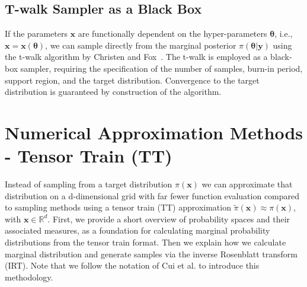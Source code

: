 \subsection{T-walk Sampler as a Black Box}
If the parameters $\bm{x}$ are functionally dependent on the hyper-parameters $\bm{\theta}$, i.e., $\bm{x} = \bm{x}(\bm{\theta})$, we can sample directly from the marginal posterior $\pi(\bm{\theta} | \bm{y})$ using the t-walk algorithm by Christen and Fox~\cite{christen2010general}. 
The t-walk is employed as a black-box sampler, requiring the specification of the number of samples, burn-in period, support region, and the target distribution. 
Convergence to the target distribution is guaranteed by construction of the algorithm.

\section{Numerical Approximation Methods - Tensor Train (TT)}
\label{sec:tensortrain}
Instead of sampling from a target distribution $\pi(\bm{x})$ we can approximate that distribution on a d-dimensional grid with far fewer function evaluation compared to sampling methods using a tensor train (TT) approximation $\tilde{\pi}(\bm{x}) \approx \pi(\bm{x})$, with  $\bm{x}\in \mathbb{R}^d$.
First, we provide a short overview of probability spaces and their associated measures, as a foundation for calculating marginal probability distributions from the tensor train format.
Then we explain how we calculate marginal distribution and generate samples via the inverse Rosenblatt transform (IRT).
Note that we follow the notation of Cui et al. \cite{cui2022deep} to introduce this methodology.

